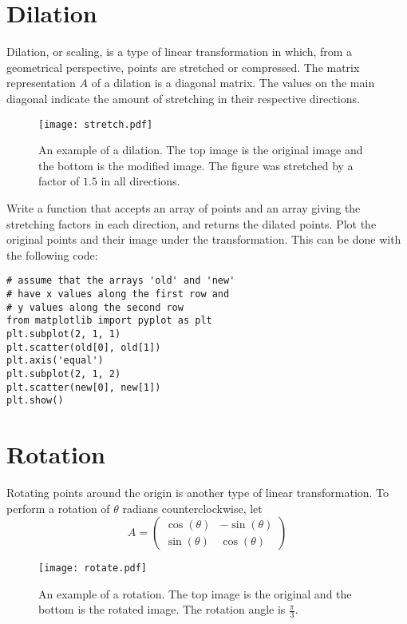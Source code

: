 \section*{Dilation}
Dilation, or scaling, is a type of linear transformation in which, from a
geometrical perspective, points are stretched or compressed.
The matrix representation $A$ of a dilation is a diagonal matrix. The values
on the main diagonal indicate the amount of stretching in their respective
directions.
\begin{figure}
\centering
\texttt{[image: stretch.pdf]}
\caption{
An example of a dilation. The top image is the original image and the bottom is
the modified image.
The figure was stretched by a factor of $1.5$ in all directions.}
\end{figure}

\begin{problem}
Write a function that accepts an array of points and an array giving the
stretching factors in each direction, and returns the dilated points.
Plot the original points and their image under the transformation.
This can be done with the following code:
\begin{lstlisting}
# assume that the arrays 'old' and 'new'
# have x values along the first row and
# y values along the second row
from matplotlib import pyplot as plt
plt.subplot(2, 1, 1)
plt.scatter(old[0], old[1])
plt.axis('equal')
plt.subplot(2, 1, 2)
plt.scatter(new[0], new[1])
plt.show()
\end{lstlisting}
\end{problem}

\section*{Rotation}
Rotating points around the origin is another type of linear transformation.
To perform a rotation of $\theta$ radians counterclockwise, let
\[
A = \begin{pmatrix}
\cos(\theta) & -\sin(\theta) \\
\sin(\theta) & \cos(\theta)
\end{pmatrix}
\]

\begin{figure}
\centering
\texttt{[image: rotate.pdf]}
\caption{An example of a rotation.
The top image is the original and the bottom is the rotated image.
The rotation angle is $\frac{\pi}{3}$.}
\label{basis:rotate}
\end{figure}

